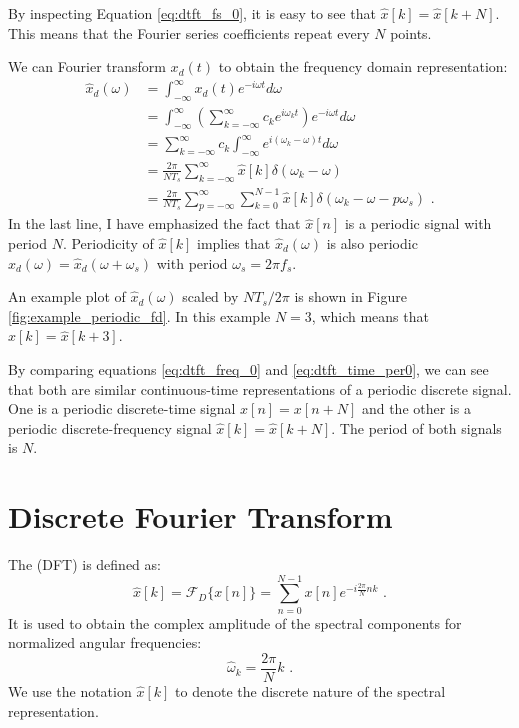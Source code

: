 By inspecting Equation \ref{eq:dtft_fs_0}, it is easy to see that
$\hat{x}[k]=\hat{x}[k+N]$. This means that the Fourier series
coefficients repeat every $N$ points.

We can Fourier transform $x_d(t)$ to obtain the frequency domain
representation:
\begin{align}
\hat{x}_d(\omega) &= \int_{-\infty}^{\infty} x_d(t) e^{-i\omega t}d\omega\\
                  &= \int_{-\infty}^{\infty} \left(\sum_{k=-\infty}^{\infty} c_k e^{i\omega_k t}\right) e^{-i\omega t} d\omega\\
                  &= \sum_{k=-\infty}^{\infty} c_k \int_{-\infty}^{\infty}  e^{i(\omega_k-\omega) t} d\omega\\
                  &= \frac{2\pi}{N T_s}\sum_{k=-\infty}^{\infty} \hat{x}[k] \delta\left(\omega_k-\omega\right)\\
                  &= \frac{2\pi}{N T_s}\sum_{p=-\infty}^{\infty} \sum_{k=0}^{N-1} \hat{x}[k] \delta\left(\omega_k-\omega - p \omega_s\right) \,\,.
\label{eq:dtft_freq_0}
\end{align}
In the last line, I have emphasized the fact that $\hat{x}[n]$ is a
periodic signal with period $N$. Periodicity of $\hat{x}[k]$ implies
that $\hat{x}_d(\omega)$ is also periodic $\hat{x}_d(\omega)
= \hat{x}_d(\omega+\omega_s)$ with period $\omega_s = 2\pi f_s$.

An example plot of $\hat{x}_d(\omega)$ scaled by $N T_s/2\pi$ is shown
in Figure \ref{fig:example_periodic_fd}. In this example $N=3$, which
means that $\hat{x}[k]=\hat{x}[k+3]$.

By comparing equations \ref{eq:dtft_freq_0}
and \ref{eq:dtft_time_per0}, we can see that both are similar
continuous-time representations of a periodic discrete signal. One is
a periodic discrete-time signal $x[n]=x[n+N]$ and the other is a
periodic discrete-frequency signal $\hat{x}[k]=\hat{x}[k+N]$. The
period of both signals is $N$.


\newpage 
\section{Discrete Fourier Transform}

The  (DFT) is defined as:
\begin{equation}
\boxed{
\hat{x}[k] = \mathcal{F}_D\{x[n]\} =\sum_{n=0}^{N-1} x[n] e^{-i\frac{2\pi}{N} nk}
} \,\,.
\label{eq:dft_forward_eq}
\end{equation}
It is used to obtain the complex amplitude of the spectral components
for normalized angular frequencies:
\begin{equation}
\boxed{
\hat{\omega}_k = \frac{2\pi}{N}k
} \,\,.
\end{equation}
We use the notation $\hat{x}[k]$ to denote the discrete nature of the
spectral representation.

